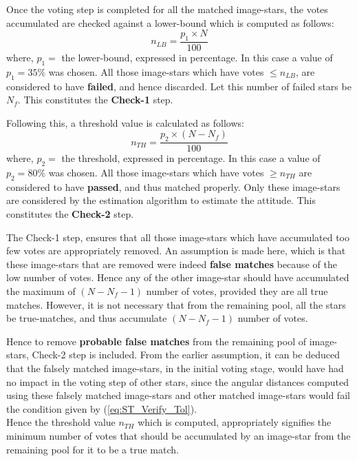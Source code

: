 \documentclass[../../main.tex]{subfiles}
\begin{document}
Once the voting step is completed for all the matched image-stars, the votes accumulated are checked against a lower-bound which is computed as follows:
\begin{equation}
    n_{LB} = \frac{p_1 \times N}{100}
\end{equation}
where, $p_1=$ the lower-bound, expressed in percentage. In this case a value of $p_1=35\%$ was chosen. 
All those image-stars which have votes $\le n_{LB}$, are considered to have \textbf{failed}, and hence discarded. Let this number of failed stars be $N_f$.
This constitutes the \textbf{Check-1} step.

Following this, a threshold value is calculated as follows:
\begin{equation}
    n_{TH} = \frac{p_2 \times (N - N_f)}{100}
\end{equation}
where, $p_2=$ the threshold, expressed in percentage. In this case a value of $p_2=80\%$ was chosen. All those image-stars which have votes $\ge n_{TH}$ are considered to have \textbf{passed}, and thus matched properly. 
Only these image-stars are considered by the estimation algorithm to estimate the attitude.
This constitutes the \textbf{Check-2} step.

The Check-1 step, ensures that all those image-stars which have accumulated too few votes are appropriately removed. 
An assumption is made here, which is that these image-stars that are removed were indeed \textbf{false matches} because of the low number of votes.
Hence any of the other image-star should have accumulated the maximum of $(N-N_f-1)$ number of votes, provided they are all true matches. 
However, it is not necessary that from the remaining pool, all the stars be true-matches, and thus accumulate $(N-N_f-1)$ number of votes.

Hence to remove \textbf{probable false matches} from the remaining pool of image-stars, Check-2 step is included.
From the earlier assumption, it can be deduced that the falsely matched image-stars, in the initial voting stage, would have had no impact in the voting step of other stars, since the angular distances computed using these falsely matched image-stars and other matched image-stars would fail the condition given by (\ref{eq:ST_Verify_Tol}). \\
Hence the threshold value $n_{TH}$ which is computed, appropriately signifies the minimum number of votes that should be accumulated by an image-star from the remaining pool for it to be a true match.

\end{document}
